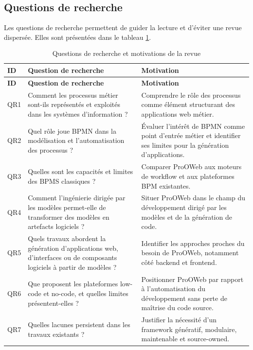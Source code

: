 \documentclass[12pt,a4paper]{article}
\begin{document}
\subsection{Questions de recherche}

Les questions de recherche permettent de guider la lecture et d'éviter une revue dispersée. Elles sont présentées dans le tableau \ref{tab:questions-recherche}.

\begin{longtable}{|p{1.4cm}|p{8cm}|p{5cm}|}
\caption{Questions de recherche et motivations de la revue}
\label{tab:questions-recherche}\\
\hline
\textbf{ID} & \textbf{Question de recherche} & \textbf{Motivation} \\
\hline
\endfirsthead
\hline
\textbf{ID} & \textbf{Question de recherche} & \textbf{Motivation} \\
\hline
\endhead
QR1 & Comment les processus métier sont-ils représentés et exploités dans les systèmes d'information ? & Comprendre le rôle des processus comme élément structurant des applications web métier. \\
\hline
QR2 & Quel rôle joue BPMN dans la modélisation et l'automatisation des processus ? & Évaluer l'intérêt de BPMN comme point d'entrée métier et identifier ses limites pour la génération d'applications. \\
\hline
QR3 & Quelles sont les capacités et limites des BPMS classiques ? & Comparer ProOWeb aux moteurs de workflow et aux plateformes BPM existantes. \\
\hline
QR4 & Comment l'ingénierie dirigée par les modèles permet-elle de transformer des modèles en artefacts logiciels ? & Situer ProOWeb dans le champ du développement dirigé par les modèles et de la génération de code. \\
\hline
QR5 & Quels travaux abordent la génération d'applications web, d'interfaces ou de composants logiciels à partir de modèles ? & Identifier les approches proches du besoin de ProOWeb, notamment côté backend et frontend. \\
\hline
QR6 & Que proposent les plateformes low-code et no-code, et quelles limites présentent-elles ? & Positionner ProOWeb par rapport à l'automatisation du développement sans perte de maîtrise du code source. \\
\hline
QR7 & Quelles lacunes persistent dans les travaux existants ? & Justifier la nécessité d'un framework génératif, modulaire, maintenable et source-owned. \\
\hline
\end{longtable}
\end{document}
